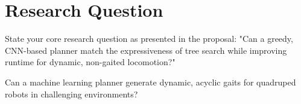 \section{Research Question}

\begin{outline}
  State your core research question as presented in the proposal:
  "Can a greedy, CNN-based planner match the expressiveness of tree
  search while improving runtime for dynamic, non-gaited locomotion?"
\end{outline}

\begin{emphasis}
  Can a machine learning planner generate dynamic, acyclic gaits for
  quadruped robots in challenging environments?
\end{emphasis}
